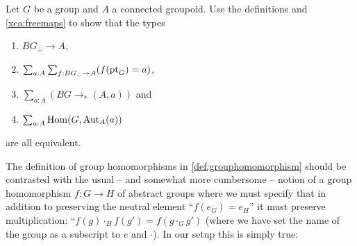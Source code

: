 \begin{xca}\label{xca:BGtotype}
  Let $G$ be a group and $A$ a connected groupoid.  Use the definitions and \cref{xca:freemaps} to show that the types
  \begin{enumerate}
  \item $BG_\div\to A$, 
  \item $\sum_{a:A}\sum_{f:BG_\div \to A}(f({\mathord{\mathrm{pt}}}_G)=a)$, 
  \item $\sum_{a:A}(BG\to_*(A,a))$ and 
  \item $\sum_{a:A}\mathrm{Hom}(G,\mathrm{Aut}_A(a))$
  \end{enumerate}
 are all equivalent.
\end{xca}

The definition of group homomorphisms in \cref{def:grouphomomorphism} should be contrasted with the usual -- and somewhat more cumbersome -- notion of a group homomorphism $f\colon G\to H$ of abstract groups where we must specify that in addition to preserving the neutral element ``$f(e_G)=e_H$'' it must preserve multiplication: ``$f(g)\cdot_H f(g')=f(g\cdot_G g')$ (where we have set the name of the group as a subscript to $e$ and $\cdot$).  In our setup this is simply true:

